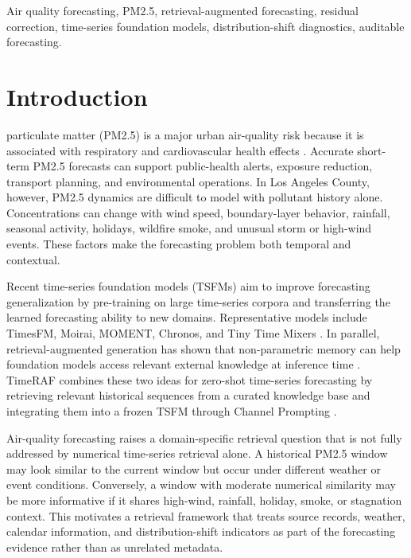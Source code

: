 \documentclass{ieeeaccess}
\begin{document}
\begin{keywords}
Air quality forecasting, PM2.5, retrieval-augmented forecasting, residual correction, time-series foundation models, distribution-shift diagnostics, auditable forecasting.
\end{keywords}

\titlepgskip=-21pt

\maketitle

\section{Introduction}

 particulate matter (PM2.5) is a major urban air-quality risk because it is
associated with respiratory and cardiovascular health effects
\cite{who2021airquality}. Accurate short-term PM2.5 forecasts can support
public-health alerts, exposure reduction, transport planning, and environmental
operations. In Los Angeles County, however, PM2.5 dynamics are difficult to
model with pollutant history alone. Concentrations can change with wind speed,
boundary-layer behavior, rainfall, seasonal activity, holidays, wildfire smoke,
and unusual storm or high-wind events. These factors make the forecasting problem
both temporal and contextual.

Recent time-series foundation models (TSFMs) aim to improve forecasting
generalization by pre-training on large time-series corpora and transferring the
learned forecasting ability to new domains. Representative models include
TimesFM, Moirai, MOMENT, Chronos, and Tiny Time Mixers
\cite{das2024timesfm,woo2024moirai,goswami2024moment,ansari2024chronos,ekambaram2024ttm}.
In parallel, retrieval-augmented generation has shown that non-parametric memory
can help foundation models access relevant external knowledge at inference time
\cite{lewis2020rag,karpukhin2020dpr}. TimeRAF combines these two ideas for
zero-shot time-series forecasting by retrieving relevant historical sequences
from a curated knowledge base and integrating them into a frozen TSFM through
Channel Prompting \cite{zhang2025timeraf}.

Air-quality forecasting raises a domain-specific retrieval question that is not
fully addressed by numerical time-series retrieval alone. A historical PM2.5
window may look similar to the current window but occur under different weather
or event conditions. Conversely, a window with moderate numerical similarity may
be more informative if it shares high-wind, rainfall, holiday, smoke, or
stagnation context. This motivates a retrieval framework that treats source
records, weather, calendar information, and distribution-shift indicators as
part of the forecasting evidence rather than as unrelated metadata.
\end{document}
